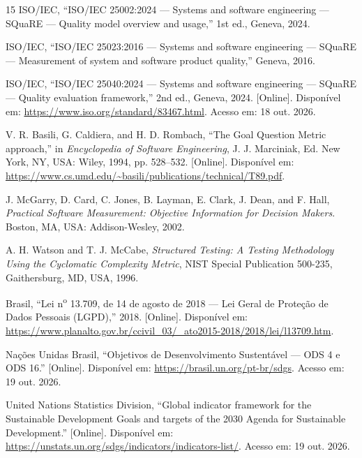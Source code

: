 \documentclass[conference]{model/IEEEtran}%
\begin{document}
\begin{thebibliography}{15}
ISO/IEC, ``ISO/IEC 25002:2024 --- Systems and software engineering --- SQuaRE --- Quality model overview and usage,'' 1st ed., Geneva, 2024.

ISO/IEC, ``ISO/IEC 25023:2016 --- Systems and software engineering --- SQuaRE --- Measurement of system and software product quality,'' Geneva, 2016.

ISO/IEC, ``ISO/IEC 25040:2024 --- Systems and software engineering --- SQuaRE --- Quality evaluation framework,'' 2nd ed., Geneva, 2024. [Online]. Dispon\'ivel em: \url{https://www.iso.org/standard/83467.html}. Acesso em: 18 out. 2026.

V. R. Basili, G. Caldiera, and H. D. Rombach, ``The Goal Question Metric approach,'' in \emph{Encyclopedia of Software Engineering}, J. J. Marciniak, Ed. New York, NY, USA: Wiley, 1994, pp. 528--532. [Online]. Dispon\'ivel em: \url{https://www.cs.umd.edu/~basili/publications/technical/T89.pdf}.

J. McGarry, D. Card, C. Jones, B. Layman, E. Clark, J. Dean, and F. Hall, \emph{Practical Software Measurement: Objective Information for Decision Makers}. Boston, MA, USA: Addison-Wesley, 2002.

A. H. Watson and T. J. McCabe, \emph{Structured Testing: A Testing Methodology Using the Cyclomatic Complexity Metric}, NIST Special Publication 500-235, Gaithersburg, MD, USA, 1996.

Brasil, ``Lei n\textsuperscript{o} 13.709, de 14 de agosto de 2018 --- Lei Geral de Prote\c{c}\~ao de Dados Pessoais (LGPD),'' 2018. [Online]. Dispon\'ivel em: \url{https://www.planalto.gov.br/ccivil_03/_ato2015-2018/2018/lei/l13709.htm}.

Na\c{c}\~oes Unidas Brasil, ``Objetivos de Desenvolvimento Sustent\'avel --- ODS 4 e ODS 16.'' [Online]. Dispon\'ivel em: \url{https://brasil.un.org/pt-br/sdgs}. Acesso em: 19 out. 2026.

United Nations Statistics Division, ``Global indicator framework for the Sustainable Development Goals and targets of the 2030 Agenda for Sustainable Development.'' [Online]. Dispon\'ivel em: \url{https://unstats.un.org/sdgs/indicators/indicators-list/}. Acesso em: 19 out. 2026.

\end{thebibliography}

\clearpage
\appendices
\end{document}
